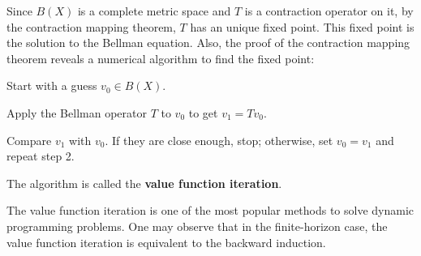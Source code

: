\documentclass[12pt]{article}
\begin{document}
\begin{comment}
\begin{pf}
    We are going to check the conditions in Blackwell's Theorem are 
    satisfied. First, if $v\leq w$, $v,w\in B(X)$, let $c_v$ and 
    $c_w$ be the optimal consumption for $v$ and $w$, respectively. 
    Then 
    \begin{equation}
        \begin{split}
            Tv(y) 
            &= u(c_v) + \beta\int v(zf(y-c_v))\phi(dz)\\
            &\leq u(c_v) + \beta\int w(zf(y-c_v))\phi(dz)\\
            &\leq u(c_w) + \beta\int w(zf(y-c_w))\phi(dz) = Tw(y).
        \end{split}
    \end{equation} 
    Thus the monotonicity is satisfied. Second, for any $c\in\R_+$, 
    \begin{equation}
        \begin{split}
            T(v+c)(y) 
            &= u(c) + \beta\int v(zf(y-c))\phi(dz)\\
            &\leq u(c) + \beta\int v(zf(y-c))+c \phi(dz)
            = Tv(y) + \alpha c.
        \end{split}
    \end{equation}
    This completes the proof.
\end{pf}
\end{comment}

Since $B(X)$ is a complete metric space and $T$ is a contraction 
operator on it, by the contraction mapping theorem, $T$ has an 
unique fixed point. This fixed point is the solution to the 
Bellman equation. Also, the proof of the contraction mapping 
theorem reveals a numerical algorithm to find the fixed point:
\begin{thmenum}
    \item Start with a guess $v_0\in B(X)$.
    \item Apply the Bellman operator $T$ to $v_0$ to get $v_1 = 
    Tv_0$. 
    \item Compare $v_1$ with $v_0$. If they are close enough, 
    stop; otherwise, set $v_0 = v_1$ and repeat step 2.
\end{thmenum} 
The algorithm is called the \textbf{value function iteration}. 

The value function iteration is one of the most popular methods 
to solve dynamic programming problems. One may observe that in the 
finite-horizon case, the value function iteration is equivalent to 
the backward induction. 
\end{document}
